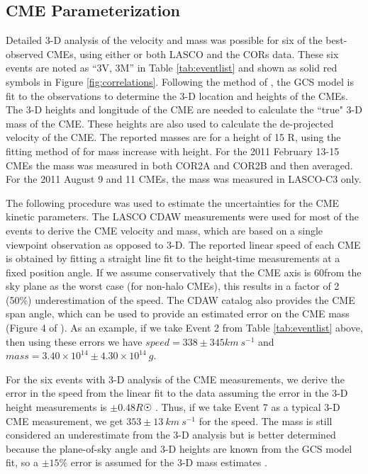 \subsection{CME Parameterization}
Detailed 3-D analysis of the velocity and mass was possible for six of the best-observed CMEs, using either or both LASCO and the CORs data. These six events are noted as “3V, 3M” in Table \ref{tab:eventlist} and shown as solid red symbols in Figure \ref{fig:correlations}. Following the method of \citet{Colaninno2009}, the GCS model is fit to the observations to determine the 3-D location and heights of the CMEs. The 3-D heights and longitude of the CME are needed to calculate the ``true" 3-D mass of the CME. These heights are also used to calculate the de-projected velocity of the CME. The reported masses are for a height of 15 R\astrosun, using the fitting method of \citet{Bein2013} for mass increase with height. For the 2011 February 13-15 CMEs the mass was measured in both COR2A and COR2B and then averaged. For the 2011 August 9 and 11 CMEs, the mass was measured in LASCO-C3 only.

The following procedure was used to estimate the uncertainties for the CME kinetic parameters. The LASCO CDAW measurements were used for most of the events to derive the CME velocity and mass, which are based on a single viewpoint observation as opposed to 3-D. The reported linear speed of each CME is obtained by fitting a straight line fit to the height-time measurements at a fixed position angle. If we assume conservatively that the CME axis is 60\degree from the sky plane as the worst case (for non-halo CMEs), this results in a factor of 2 (50\%) underestimation of the speed. The CDAW catalog also provides the CME span angle, which can be used to provide an estimated error on the CME mass (Figure 4 of \citealt{Vourlidas2010}). As an example, if we take Event 2 from Table \ref{tab:eventlist} above, then using these errors we have $speed = 338 \pm 345 km\ s^{-1}$ and $mass = 3.40 \times 10^{14} \pm 4.30 \times 10^{14}\ g$. 

For the six events with 3-D analysis of the CME measurements, we derive the error in the speed from the linear fit to the data assuming the error in the 3-D height measurements is $\pm 0.48 R\astrosun$ \citep{Colaninno2013}. Thus, if we take Event 7 as a typical 3-D CME measurement, we get $353 \pm 13\ km\ s^{-1}$ for the speed. The mass is still considered an underestimate from the 3-D analysis but is better determined because the plane-of-sky angle and 3-D heights are known from the GCS model fit, so a $\pm 15\%$ error is assumed for the 3-D mass estimates \citep{Bein2013}.

